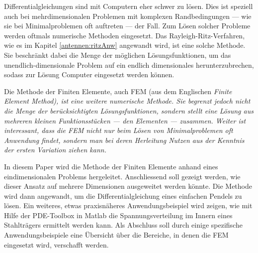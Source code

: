 %
%
%
%



Differentialgleichungen sind mit Computern eher schwer zu lösen. 
Dies ist speziell auch bei mehrdimensionalen Problemen mit komplexen Randbedingungen --- wie sie bei Minimalproblemen oft auftreten --- der Fall. 
Zum Lösen solcher Probleme werden oftmals numerische Methoden eingesetzt. 
Das Rayleigh-Ritz-Verfahren, wie es im Kapitel \ref{antennen:ritzAnw} angewandt wird, ist eine solche Methode.
Sie beschränkt dabei die Menge der möglichen Lösungsfunktionen, um das unendlich-dimensionale Problem auf ein endlich dimensionales herunterzubrechen, sodass zur Lösung Computer eingesetzt werden können. 

Die Methode der Finiten Elemente, auch FEM (aus dem Englischen \em{Finite Element Method}), ist eine weitere numerische Methode.
Sie begrenzt jedoch nicht die Menge der berücksichtigten Lösungsfunktionen, sondern stellt eine Lösung aus mehreren kleinen Funktionsstücken --- den Elementen --- zusammen.
Weiter ist interessant, dass die FEM nicht nur beim Lösen von Minimalproblemen oft Anwendung findet, sondern man bei deren Herleitung Nutzen aus der Kenntnis der ersten Variation ziehen kann. 

In diesem Paper wird die Methode der Finiten Elemente anhand eines eindimensionalen Problems hergeleitet. 
Anschliessend soll gezeigt werden, wie dieser Ansatz auf mehrere Dimensionen ausgeweitet werden könnte. 
Die Methode wird dann angewandt, um die Differentialgleichung eines einfachen Pendels zu lösen. 
Ein weiteres, etwas praxisnäheres Anwendungsbeispiel wird zeigen, wie mit Hilfe der PDE-Toolbox in Matlab die Spannungsverteilung im Innern eines Stahlträgers ermittelt werden kann. %
Als Abschluss soll durch einige spezifische Anwendungsbeispiele eine Übersicht über die Bereiche, in denen die FEM eingesetzt wird, verschafft werden.
